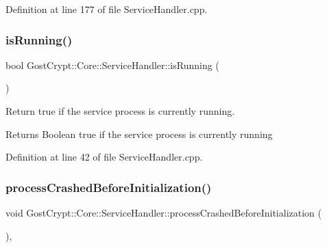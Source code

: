 Definition at line 177 of file Service\+Handler.\+cpp.

\mbox{\label{class_gost_crypt_1_1_core_1_1_service_handler_a769c0bd8e4b9eac2492dda34b446405c}} 
\subsubsection{\texorpdfstring{is\+Running()}{isRunning()}}
{\footnotesize\ttfamily bool Gost\+Crypt\+::\+Core\+::\+Service\+Handler\+::is\+Running (\begin{DoxyParamCaption}{ }\end{DoxyParamCaption})}



Return true if the service process is currently running. 

\begin{DoxyReturn}{Returns}
Boolean true if the service process is currently running 
\end{DoxyReturn}


Definition at line 42 of file Service\+Handler.\+cpp.

\mbox{\label{class_gost_crypt_1_1_core_1_1_service_handler_aa2e50a9702c5d0a01f5d6cda3611d5e8}} 
\subsubsection{\texorpdfstring{process\+Crashed\+Before\+Initialization()}{processCrashedBeforeInitialization()}}
{\footnotesize\ttfamily void Gost\+Crypt\+::\+Core\+::\+Service\+Handler\+::process\+Crashed\+Before\+Initialization (\begin{DoxyParamCaption}{ }\end{DoxyParamCaption})\hspace{0.3cm}{\ttfamily [protected]}, {\ttfamily [virtual]}}



